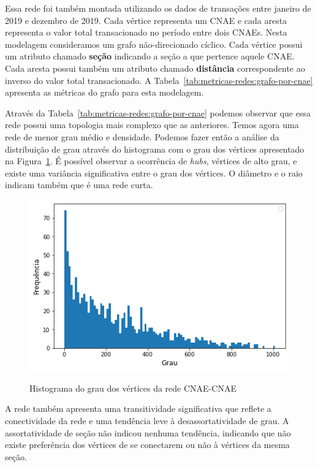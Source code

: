 Essa rede foi também montada utilizando os dados de transações entre janeiro de 2019 e dezembro de 2019. Cada vértice representa um CNAE e cada aresta representa o valor total transacionado no período entre dois CNAEs. Nesta modelagem consideramos um grafo não-direcionado cíclico. Cada vértice possui um atributo chamado \textbf{seção} indicando a seção a que pertence aquele CNAE. Cada aresta possui também um atributo chamado \textbf{distância} correspondente ao inverso do valor total transacionado. A Tabela~\ref{tab:metricas-redes:grafo-por-cnae} apresenta as métricas do grafo para esta modelagem.

Através da Tabela~\ref{tab:metricas-redes:grafo-por-cnae} podemos observar que essa rede possui uma topologia mais complexo que as anteriores. Temos agora uma rede de menor grau médio e densidade. Podemos fazer então a análise da distribuição de grau através do histograma com o grau dos vértices apresentado na Figura~\ref{fig:metricas-redes:base-de-dados-29-degree-distribution-cnae}. É possível observar a ocorrência de \textit{hubs}, vértices de alto grau, e existe uma variância significativa entre o grau dos vértices. O diâmetro e o raio indicam também que é uma rede curta.

\begin{figure}[htb]
	\centering
    \caption{Histograma do grau dos vértices da rede CNAE-CNAE}
    \includegraphics[scale=0.6]{images/base-de-dados-29-degree-distribution-cnae.png}
    \label{fig:metricas-redes:base-de-dados-29-degree-distribution-cnae}
    \fdadospesquisa
\end{figure}

A rede também apresenta uma transitividade significativa que reflete a conectividade da rede e uma tendência leve à desassortatividade de grau. A assortatividade de seção não indicou nenhuma tendência, indicando que não existe preferência dos vértices de se conectarem ou não à vértices da mesma seção.

